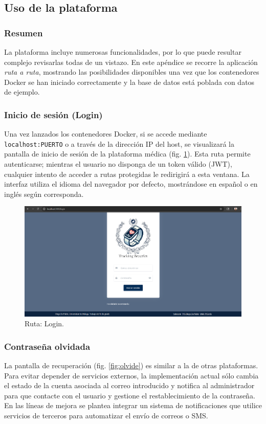 \documentclass[12pt, a4paper]{article}
\begin{document}
\begin{umaappendices}
	
	\subsection{Uso de la plataforma}
	
	\subsubsection{Resumen}
	La plataforma incluye numerosas funcionalidades, por lo que puede resultar complejo revisarlas todas de un vistazo. En este apéndice se recorre la aplicación \emph{ruta a ruta}, mostrando las posibilidades disponibles una vez que los contenedores Docker se han iniciado correctamente y la base de datos está poblada con datos de ejemplo.
	
	\subsubsection{Inicio de sesión (Login)}
	Una vez lanzados los contenedores Docker, si se accede mediante \texttt{localhost:PUERTO} o a través de la dirección IP del host, se visualizará la pantalla de inicio de sesión de la plataforma médica (fig. \ref{fig:login}). Esta ruta permite autenticarse; mientras el usuario no disponga de un token válido (JWT), cualquier intento de acceder a rutas protegidas le redirigirá a esta ventana. La interfaz utiliza el idioma del navegador por defecto, mostrándose en español o en inglés según corresponda.
	
	\begin{figure}[htbp]
		\centering
		\includegraphics[width=1\textwidth]{images/1_login.png}
		\caption[Ejemplo]{Ruta: Login.}
		\label{fig:login}
	\end{figure}
	
	\subsubsection{Contraseña olvidada}
	La pantalla de recuperación (fig. \ref{fig:olvide}) es similar a la de otras plataformas. Para evitar depender de servicios externos, la implementación actual sólo cambia el estado de la cuenta asociada al correo introducido y notifica al administrador para que contacte con el usuario y gestione el restablecimiento de la contraseña. En las líneas de mejora se plantea integrar un sistema de notificaciones que utilice servicios de terceros para automatizar el envío de correos o SMS.
	

\end{umaappendices}
\end{document}
